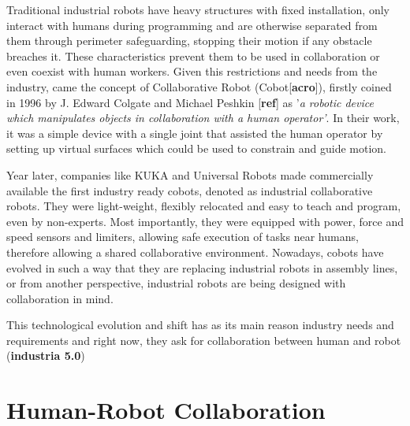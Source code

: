 \par Traditional industrial robots have heavy structures with fixed installation, only interact with humans during programming and are otherwise separated from them through perimeter safeguarding, stopping their motion if any obstacle breaches it. These characteristics prevent them to be used in collaboration or even coexist with human workers. Given this restrictions and needs from the industry, came the concept of Collaborative Robot (Cobot[\textbf{acro}]), firstly coined in 1996 by J. Edward Colgate and Michael Peshkin [\textbf{ref}] as '\textit{a robotic device which manipulates objects in collaboration with a human operator'}. In their work, it was a simple device with a single joint that assisted the human operator by setting up virtual surfaces which could be used to constrain and guide motion.


\par Year later, companies like KUKA and Universal Robots made commercially available the first industry ready cobots, denoted as industrial collaborative robots. They were light-weight, flexibly relocated and easy to teach and program, even by non-experts. Most importantly, they were equipped with power, force and speed sensors and limiters, allowing safe execution of tasks near humans, therefore allowing a shared collaborative environment. 
% 
Nowadays, cobots have evolved in such a way that they are replacing industrial robots in assembly lines, or from another perspective, industrial robots are being designed with collaboration in mind.

\par This technological evolution and shift has as its main reason industry needs and requirements and right now, they ask for collaboration between human and robot (\textbf{industria 5.0})



\section{Human-Robot Collaboration}

